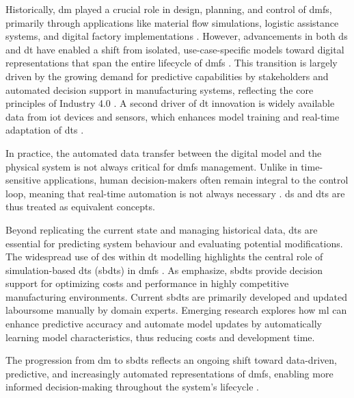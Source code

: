 Historically, \gls{dm} played a crucial role in design, planning, and control of \gls{dmfs}, primarily through applications like material flow simulations, logistic assistance systems, and digital factory implementations \autocite{Thiede2013}. However, advancements in both \gls{ds} and \gls{dt} have enabled a shift from isolated, use-case-specific models toward digital representations that span the entire lifecycle of \gls{dmfs} \autocite{Abdoune2023}. This transition is largely driven by the growing demand for predictive capabilities by stakeholders and automated decision support in manufacturing systems, reflecting the core principles of Industry 4.0 \autocite{frank2019industry}. A second driver of \gls{dt} innovation is widely available data from \gls{iot} devices and sensors, which enhances model training and real-time adaptation of \gls{dt}s \autocite{Tao2018ijamt}.

In practice, the automated data transfer between the digital model and the physical system is not always critical for \gls{dmfs} management. Unlike in time-sensitive applications, human decision-makers often remain integral to the control loop, meaning that real-time automation is not always necessary \autocite{Schwede2024}. \gls{ds} and \gls{dt}s are thus treated as equivalent concepts.

Beyond replicating the current state and managing historical data, \gls{dt}s are essential for predicting system behaviour and evaluating potential modifications. The widespread use of \gls{des} within \gls{dt} modelling highlights the central role of simulation-based \gls{dt}s (\gls{sbdt}s) in \gls{dmfs} \autocite{Lugaresi2021aifac}. As \textcite{Schwede2024} emphasize, \gls{sbdt}s provide decision support for optimizing costs and performance in highly competitive manufacturing environments. Current \gls{sbdt}s are primarily developed and updated laboursome manually by domain experts. Emerging research explores how \gls{ml} can enhance predictive accuracy and automate model updates by automatically learning model characteristics, thus reducing costs and development time.

The progression from \gls{dm} to \gls{sbdt}s reflects an ongoing shift toward data-driven, predictive, and increasingly automated representations of \gls{dmfs}, enabling more informed decision-making throughout the system's lifecycle \autocite{boschert2016digital,lim2020state}.

